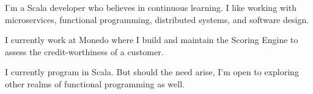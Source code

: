 

\begin{cvparagraph}

I'm a Scala developer who believes in continuous learning. I like working with microservices, functional programming, distributed systems, and software design.

I currently work at Monedo where I build and maintain the Scoring Engine to assess the credit-worthiness of a customer.

I currently program in Scala. But should the need arise, I'm open to exploring other realms of functional programming as well.
\end{cvparagraph}
